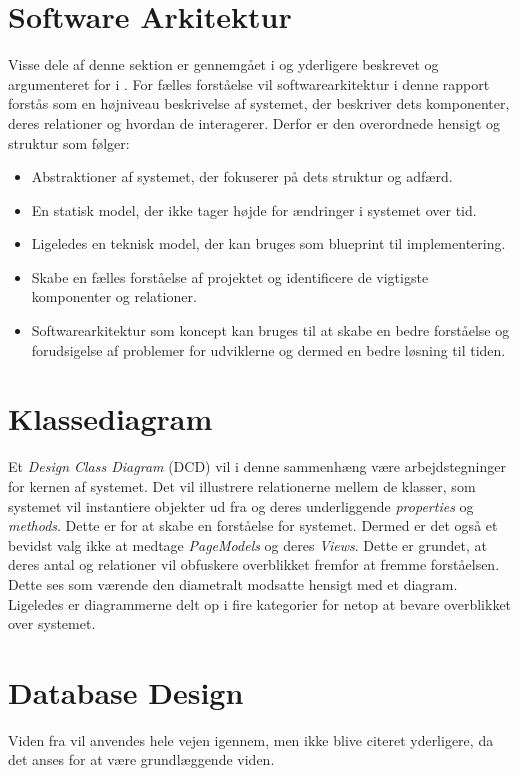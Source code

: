 \section{Software Arkitektur}
\label{sec:software-arkitektur}
Visse dele af denne sektion er gennemgået i  og yderligere beskrevet og argumenteret for i . 
For fælles forståelse vil softwarearkitektur i denne rapport forstås som en højniveau beskrivelse af systemet, der beskriver dets komponenter, deres relationer og hvordan de interagerer. 
Derfor er den overordnede hensigt og struktur som følger:
\begin{itemize}
    \item Abstraktioner af systemet, der fokuserer på dets struktur og adfærd.
    \item En statisk model, der ikke tager højde for ændringer i systemet over tid.
    \item Ligeledes en teknisk model, der kan bruges som blueprint til implementering.
    \item Skabe en fælles forståelse af projektet og identificere de vigtigste komponenter og relationer.
    \item Softwarearkitektur som koncept kan bruges til at skabe en bedre forståelse og forudsigelse af problemer for udviklerne og dermed en bedre løsning til tiden.
\end{itemize}

\section{Klassediagram}
\label{sec:class-diagram}
Et \emph{Design Class Diagram} (DCD) vil i denne sammenhæng være arbejdstegninger for kernen af systemet. Det vil illustrere relationerne mellem de klasser, som systemet vil instantiere objekter ud fra og deres underliggende \emph{properties} og \emph{methods}. 
Dette er for at skabe en forståelse for systemet. Dermed er det også et bevidst valg ikke at medtage \emph{PageModels} og deres \emph{Views}. Dette er grundet, at deres antal og relationer vil obfuskere overblikket fremfor at fremme forståelsen. 
Dette ses som værende den diametralt modsatte hensigt med et diagram. Ligeledes er diagrammerne delt op i fire kategorier for netop at bevare overblikket over systemet.

\section{Database Design}
\label{sec:database-design}
Viden fra \cite{connolly2023database} vil anvendes hele vejen igennem, men ikke blive citeret yderligere, da det anses for at være grundlæggende viden.

